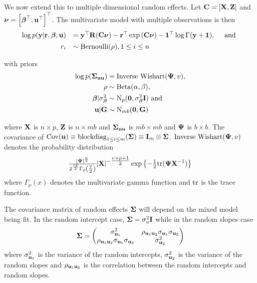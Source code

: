 \noindent We now extend this to multiple dimensional random effects. Let ${\bf C} = [{\bf X}, {\bf Z}]$ and
${\boldsymbol \nu} = \left[ {\boldsymbol \beta}^\top, {\bf u}^\top \right]^\top$. The multivariate model with multiple observations is then
$$
	\begin{array}{rl}
		\log{p({\bf y}|{\bf r}, {\boldsymbol\beta}, {\bf u})} & = {\bf y}^\top {\bf R} ({\bf C}{\boldsymbol \nu}) - {\bf r}^\top \exp{({\bf C}{\boldsymbol\nu})} - {\bf 1}^\top \log{\Gamma{({\bf y}+ {\bf1})}}, \quad \mbox{ and } \\ [1ex]
		r_i                           & \sim \text{Bernoulli}(\rho), 1 \leq i \leq n                                                                     \\
	\end{array}
$$

\noindent with priors
\begin{align*}
	\log{p({\boldsymbol\Sigma}_{{\bf u}{\bf u}})} & = \text{Inverse Wishart}({\boldsymbol \Psi}, v),    \\
	\rho                       & \sim \text{Beta}(\alpha, \beta),             \\
	{\boldsymbol \beta}|\sigma^2_{\boldsymbol \beta}     & \sim \text{N}_p({\bf 0}, \sigma^2_{\boldsymbol \beta} {\bf I}) \text{ and } \\
	{\bf u}|{\bf G}       & \sim \text{N}_{mb}({\bf 0}, {\bf G})              
\end{align*}

\noindent where ${\bf X}$ is $n \times p$, ${\bf Z}$ is $n \times mb$ and ${\boldsymbol \Sigma}_{{\bf u} {\bf u}}$ is $mb \times mb$ and
${\boldsymbol \Psi}$ is $b \times b$. The covariance of $\mbox{Cov}({\bf u}) \equiv \text{blockdiag}_{1 \leq i \leq m} ({\boldsymbol \Sigma}) \equiv
{\bf I}_m \otimes {\boldsymbol\Sigma}$. $\text{Inverse Wishart}({\boldsymbol \Psi}, v)$ denotes the probability distribution
$$\tfrac{|{\boldsymbol \Psi}|^\frac{v}{2}}{2^{\frac{vp}{2}} \Gamma_p{\left(\tfrac{v}{2}\right)}} |{\bf X}|^{-\tfrac{v + p + 1}{2}}
\exp{\left\{-\tfrac{1}{2} \text{tr}{({\boldsymbol\Psi}{\bf X}^{-1})}\right\}}$$ where $\Gamma_p{(x)}$ denotes the multivariate gamma function and $\text{tr}$
is the trace function.

The covariance matrix of random effects ${\boldsymbol \Sigma}$ will depend on the mixed model being fit. In the random
intercept case, ${\boldsymbol \Sigma} = \sigma_u^2 {\bf I}$ while in the random slopes case
\[
	{\boldsymbol \Sigma} = 
	\begin{pmatrix}
		\sigma_{{\bf u}_1}^2                                 & \rho_{{\bf u}_1 {\bf u}_2} \sigma_{{\bf u}_1} \sigma_{{\bf u}_2} \\
		\rho_{{\bf u}_1 {\bf u}_2} \sigma_{{\bf u}_1} \sigma_{{\bf u}_2} & \sigma_{{\bf u}_2}^2                                 
	\end{pmatrix}
\]
where $\sigma_{{\bf u}_1}^2$ is the variance of the random intercepts, $\sigma_{{\bf u}_2}^2$ is the variance of the
random slopes and $\rho_{{\bf u}_1 {\bf u}_2}$ is the correlation between the random intercepts and random slopes.

